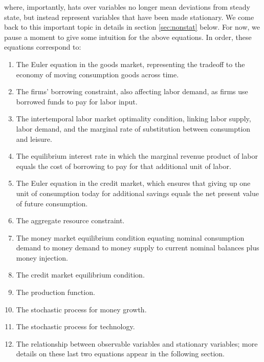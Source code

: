 where, importantly, hats over variables no longer mean deviations from steady state, but instead represent variables that have been made stationary. We come back to this important topic in details in section \ref{sec:nonstat} below. For now, we pause a moment to give some intuition for the above equations. In order, these equations correspond to:
\begin{enumerate}
\item The Euler equation in the goods market, representing the tradeoff to the economy of moving consumption goods across time.
\item The firms' borrowing constraint, also affecting labor demand, as firms use borrowed funds to pay for labor input.
\item The intertemporal labor market optimality condition, linking labor supply, labor demand, and the marginal rate of substitution between consumption and leisure. 
\item The equilibrium interest rate in which the marginal revenue product of labor equals the cost of borrowing to pay for that additional unit of labor.
\item The Euler equation in the credit market, which ensures that giving up one unit of consumption today for additional savings equals the net present value of future consumption.
\item The aggregate resource constraint.
\item The money market equilibrium condition equating nominal consumption demand to money demand to money supply to current nominal balances plus money injection. 
\item The credit market equilibrium condition.
\item The production function.
\item The stochastic process for money growth.
\item The stochastic process for technology.
\item The relationship between observable variables and stationary variables; more details on these last two equations appear in the following section. 
\end{enumerate}

